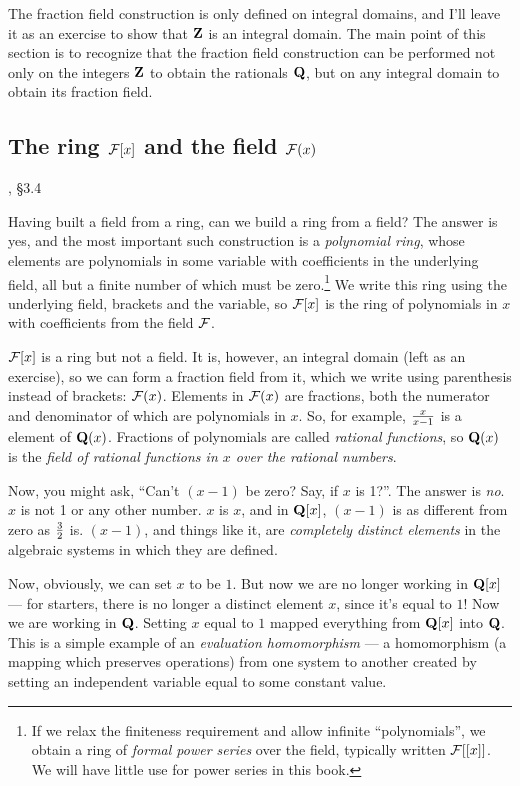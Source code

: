 The fraction field construction is only defined on integral domains,
and I'll leave it as an exercise to show that ${\bf Z}$ is an integral
domain.  The main point of this section is to recognize that the
fraction field construction can be performed not only on the integers
${\bf Z}$ to obtain the rationals ${\bf Q}$, but on any integral
domain to obtain its fraction field.

\vfill\eject

\subsection*{\qquad The ring ${\cal F}[x]$ and the field ${\cal F}(x)$}
, \S3.4

Having built a field from a ring, can we build a ring from a field?
The answer is yes, and the most important such construction is a {\it
polynomial ring}, whose elements are polynomials in some variable with
coefficients in the underlying field, all but a finite number of which
must be zero.\footnote{If we relax the finiteness requirement and
allow infinite ``polynomials'', we obtain a ring of {\it formal power series}
over the field, typically written ${\cal F}[[x]]$.  We will have
little use for power series in this book.}  We write this ring using
the underlying field, brackets and the variable, so ${\cal F}[x]$ is
the ring of polynomials in $x$ with coefficients from the field ${\cal
F}$.

${\cal F}[x]$ is a ring but not a field.  It is, however, an
integral domain (left as an exercise), so we can form a fraction field
from it, which we write using parenthesis instead of brackets: ${\cal
F}(x)$.  Elements in ${\cal F}(x)$ are fractions, both the numerator
and denominator of which are polynomials in $x$.  So, for example,
${x}\over{x-1}$ is a element of ${\bf Q}(x)$.  Fractions of
polynomials are called {\it rational functions}, so ${\bf Q}(x)$ is
the {\it field of rational functions in $x$ over the rational numbers}.

Now, you might ask, ``Can't $(x-1)$ be zero?  Say, if $x$ is 1?''.
The answer is {\it no}.  $x$ is not 1 or any other number.  $x$ is
$x$, and in ${\bf Q}[x]$, $(x-1)$ is as different from zero as $3
\over 2$ is.  $(x-1)$, and things like it, are {\it
completely distinct elements} in the algebraic systems in which they
are defined.

Now, obviously, we can set $x$ to be $1$.  But now we are no longer
working in ${\bf Q}[x]$ --- for starters, there is no longer a
distinct element $x$, since it's equal to $1$!  Now we are working in
${\bf Q}$.  Setting $x$ equal to $1$ mapped everything from ${\bf
Q}[x]$ into ${\bf Q}$.  This is a simple example of an {\it evaluation
homomorphism} --- a homomorphism (a mapping which preserves
operations) from one system to another created by setting an
independent variable equal to some constant value.

